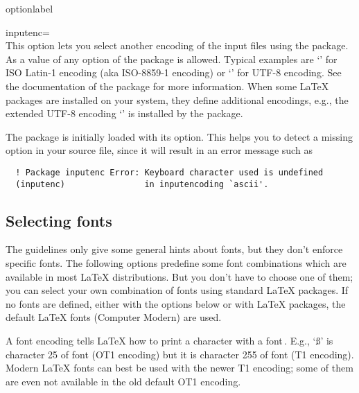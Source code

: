 \begin{labelled}{optionlabel}
\item[inputenc=\meta{enc}]\\
  This option lets you select another encoding of the input files using the
   package. As a value of  any option of the
   package is allowed. Typical examples are `'
  for ISO Latin-1 encoding (aka ISO-8859-1 encoding) or `' for
  UTF-8 encoding. See the documentation of the  package for
  more information. When some LaTeX packages are installed on your system,
  they define additional encodings, e.g., the extended UTF-8 encoding
  `' is installed by the  package.

  The  package is initially loaded with its 
  option. This helps you to detect a missing  option in your
  source file, since it will result in an error message such as
\begin{verbatim}
  ! Package inputenc Error: Keyboard character used is undefined
  (inputenc)                in inputencoding `ascii'.
\end{verbatim}
\end{labelled}

\subsection{Selecting fonts}
The guidelines only give some general hints about fonts, but they don't
enforce specific fonts. The following options predefine some font
combinations which are available in most LaTeX distributions. But you don't
have to choose one of them; you can select your own combination of fonts
using standard LaTeX packages. If no fonts are defined, either with the
options below or with LaTeX packages, the default LaTeX fonts (Computer
Modern) are used.

A font encoding tells LaTeX how to print a character with a
font\,\cite{encguide}. E.g., `\ss' is character 25 of font 
(\textsf{OT1} encoding) but it is character 255 of font 
(\textsf{T1} encoding). Modern LaTeX fonts can best be used with the newer
\textsf{T1} encoding; some of them are even not available in the old default
\textsf{OT1} encoding.

